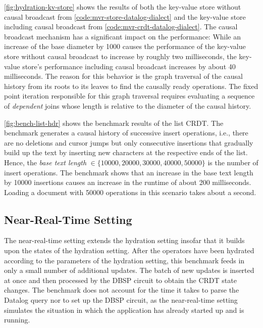 

\ref{fig:hydration-kv-store} shows the results of both the key-value store
without causal broadcast from \ref{code:mvr-store-datalog-dialect} and the
key-value store including causal broadcast from \ref{code:mvr-crdt-datalog-dialect}.
The causal broadcast mechanism has a significant impact on the performance:
While an increase of the base diameter by 1000 causes the performance of the
key-value store without causal broadcast to increase by roughly two milliseconds,
the key-value store's performance including causal broadcast increases by about
40 milliseconds.
The reason for this behavior is the graph traversal of the causal history from its
roots to its leaves to find the causally ready operations.
The fixed point iteration responsible for this graph traversal requires evaluating
a sequence of \emph{dependent} joins whose length is relative to the diameter
of the causal history.



\ref{fig:bench-list-hdr} shows the benchmark results of the list \ac{CRDT}.
The benchmark generates a causal history of successive insert operations, i.e.,
there are no deletions and cursor jumps but only consecutive insertions that
gradually build up the text by inserting new characters at the respective ends
of the list.
Hence, the \emph{base text length} \(\in \{10000, 20000, 30000, 40000, 50000\}\)
is the number of insert operations.
The benchmark shows that an increase in the base text length by 10000 insertions
causes an increase in the runtime of about 200 milliseconds.
Loading a document with 50000 operations in this scenario takes about a second.

\subsection{Near-Real-Time Setting}\label{sec:bench-nrt}

The near-real-time setting extends the hydration setting insofar that it builds
upon the states of the hydration setting.
After the operators have been hydrated according to the parameters of the
hydration setting, this benchmark feeds in only a small number of additional updates.
The batch of new updates is inserted at once and then processed by the DBSP circuit
to obtain the \ac{CRDT} state changes.
The benchmark does not account for the time it takes to parse the Datalog query
nor to set up the DBSP circuit, as the near-real-time setting simulates
the situation in which the application has already started up and is running.

